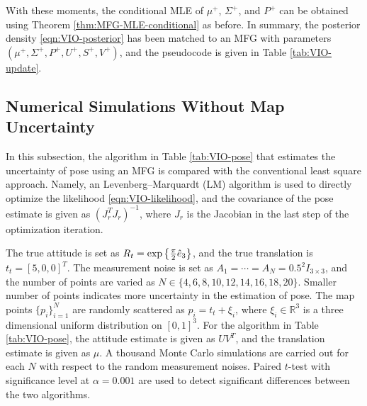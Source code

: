 With these moments, the conditional MLE of $\mu^+$, $\Sigma^+$, and $P^+$ can be obtained using Theorem \ref{thm:MFG-MLE-conditional} as before.
In summary, the posterior density \eqref{eqn:VIO-posterior} has been matched to an MFG with parameters $(\mu^+,\Sigma^+,P^+,U^+,S^+,V^+)$, and the pseudocode is given in Table \ref{tab:VIO-update}.

\subsection{Numerical Simulations Without Map Uncertainty}

In this subsection, the algorithm in Table \ref{tab:VIO-pose} that estimates the uncertainty of pose using an MFG is compared with the conventional least square approach.
Namely, an Levenberg–Marquardt (LM) algorithm is used to directly optimize the likelihood \eqref{eqn:VIO-likelihood}, and the covariance of the pose estimate is given as $(J_r^TJ_r)^{-1}$, where $J_r$ is the Jacobian in the last step of the optimization iteration.

The true attitude is set as $R_t = \exp\left\{ \tfrac{\pi}{2}\hat{e}_3 \right\}$, and the true translation is $t_t = [5,0,0]^T$.
The measurement noise is set as $A_1 = \cdots = A_N = 0.5^2I_{3\times 3}$, and the number of points are varied as $N\in\{4,6,8,10,12,14,16,18,20\}$.
Smaller number of points indicates more uncertainty in the estimation of pose.
The map points $\{p_i\}_{i=1}^N$ are randomly scattered as $p_i = t_t + \xi_i$, where $\xi_i\in\mathbb{R}^3$ is a three dimensional uniform distribution on $[0,1]^3$.
For the algorithm in Table \ref{tab:VIO-pose}, the attitude estimate is given as $UV^T$, and the translation estimate is given as $\mu$.
A thousand Monte Carlo simulations are carried out for each $N$ with respect to the random measurement noises.
Paired $t$-test with significance level at $\alpha = 0.001$ are used to detect significant differences between the two algorithms.

